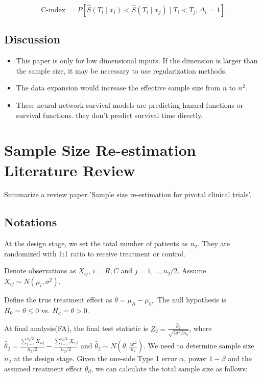 \documentclass[12pt]{article}
\begin{document}
$$
\text { C-index }=P\left[\hat{S}\left(T_i \mid
x_i\right)<\hat{S}\left(T_i \mid x_j\right) \mid T_i<T_j,
\Delta_i=1\right].
$$

\subsection{Discussion}

\begin{itemize}
  \item This paper is only for low dimensional inputs. If the
dimension is larger than the sample size, it may be necessary to use
regularization methods.
  \item The data expansion would increase the eﬀective sample size
from $n$ to $n^2$.
  \item These neural network survival models are predicting hazard
functions or survival functions. they don't predict survival time
directly.
\end{itemize}


\section{Sample Size Re-estimation Literature Review}

Summarize a review paper \citep{Liu2021review}'Sample size
re-estimation for pivotal clinical trials'.

\subsection{Notations}

At the design stage, we set the total number of patients as
$n_2$. They are randomized with 1:1 ratio to receive treatment or
control.

Denote observations as $X_{ij}$, $i=R,C$ and $j=1,...,n_{2}/2$. Assume
$X_{ij} \sim N(\mu_{i}, \sigma^{2})$.

Define the true treatment effect as $\theta=\mu_R-\mu_C$. The null
hypothesis is $H_0 = \theta \leq 0$ vs. $H_a = \theta > 0$.

At final analysis(FA), the final test statistic is $Z_2 =
\frac{\hat{\theta}_2}{\sqrt{4\sigma^2/n_2}}$, where $\hat{\theta}_2 =
\frac{\sum_{j=1}^{n_2/2} X_{Rj}}{n_2/2} - \frac{\sum_{j=1}^{n_2/2}
X_{Cj}}{n_2/2}$ and $\hat{\theta}_2 \sim N(\theta,
\frac{4\sigma^2}{n_2})$. We need to determine sample size $n_2$ at the
design stage. Given the one-side Type 1 error $\alpha$, power
$1-\beta$ and the assumed treatment effect $\theta_d$, we can
calculate the total sample size as follows:
\end{document}
